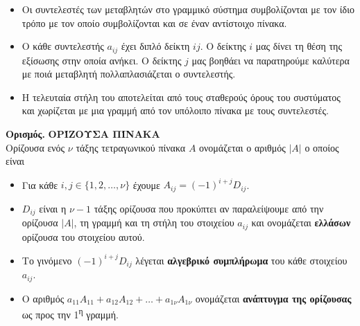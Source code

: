 \documentclass[twoside,11pt,a4paper]{book}
\newcounter{orismos}[chapter]
\renewcommand{\theorismos}{\thechapter.\arabic{orismos}}
\newcommand{\Orismos}[1]{\refstepcounter{orismos}\textcolor{red!80!black}{\large{\textbf{Ορισμός\hspace{2mm}\theorismos\hspace{1mm}}}} \MakeUppercase{\textbf{#1}}\\}{}
\begin{document}
\begin{itemize}
\item Οι συντελεστές των μεταβλητών στο γραμμικό σύστημα συμβολίζονται με τον ίδιο τρόπο με τον οποίο συμβολίζονται και σε έναν αντίστοιχο πίνακα.
\item Ο κάθε συντελεστής $ a_{ij} $ έχει διπλό δείκτη $ ij $. Ο δείκτης $ i $ μας δίνει τη θέση της εξίσωσης στην οποία ανήκει. Ο δείκτης $ j $ μας βοηθάει να παρατηρούμε καλύτερα με ποιά μεταβλητή πολλαπλασιάζεται ο συντελεστής.
\item Η τελευταία στήλη του αποτελείται από τους σταθερούς όρους του συστύματος και χωρίζεται με μια γραμμή από τον υπόλοιπο πίνακα με τους συντελεστές.
\end{itemize} 
\Orismos{Ορίζουσα πίνακα}
Ορίζουσα ενός $ \nu $ τάξης τετραγωνικού πίνακα $ A $ ονομάζεται ο αριθμός $ |A| $ ο οποίος είναι
\begin{center}
\end{center} 
\begin{itemize}[itemsep=0mm]
\item Για κάθε $ i,j\in\{1,2,\ldots,\nu\} $ έχουμε $ A_{ij}=(-1)^{i+j}D_{ij} $.
\item $ D_{ij} $ είναι η $ \nu-1 $ τάξης ορίζουσα που προκύπτει αν παραλείψουμε από την ορίζουσα $ |A| $, τη γραμμή και τη στήλη του στοιχείου $ a_{ij} $ και ονομάζεται \textbf{ελλάσων} ορίζουσα του στοιχείου αυτού.
\item Το γινόμενο $ (-1)^{i+j}D_{ij} $ λέγεται \textbf{αλγεβρικό συμπλήρωμα} του κάθε στοιχείου $ a_{ij} $.
\item Ο αριθμός $ a_{11}A_{11}+a_{12}A_{12}+\ldots+a_{1\nu}A_{1\nu} $ ονομάζεται \textbf{ανάπτυγμα της ορίζουσας} ως προς την 1\textsuperscript{η} γραμμή.
\end{itemize}
\end{document}
